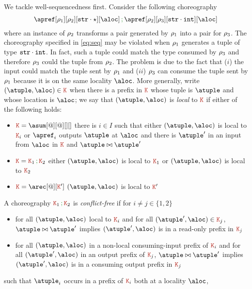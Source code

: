 We tackle well-sequencedness first.
%
Consider the following choreography
\begin{align}\label{eq:seq}
  \apref[\arole_1][\arole_2][{\asort[str] \cdot \wildcard}][\aloc] \seqop
  \apref[\arole_2][\arole_3][{\asort[str] \cdot \asort[int]}][\aloc]
\end{align}
%
where an instance of $\arole_2$ transforms a pair generated by
$\arole_1$ into a pair for $\arole_3$.
%
The choreography specified in \eqref{eq:seq} may be violated when
$\arole_1$ generates a tuple of type $\asort[str] \cdot \asort[int]$.
%
In fact, such a tuple could match the type consumed by $\arole_3$ and
therefore $\arole_3$ could  the tuple from $\arole_2$.
%
The problem is due to the fact that ($i$) the input could match the
tuple sent by $\arole_1$ and ($ii$) $\arole_3$ can consume the tuple
sent by $\arole_1$ because it is on the same locality $\aloc$.
%
More generally, write $(\atuple, \aloc) \in \aK$ when there is a
prefix in $\aK$ whose tuple is $\atuple$ and whose location is
$\aloc$; we say that $(\atuple, \aloc)$ is \emph{local} to $\aK$ if
either of the following holds:
\begin{itemize}
\item $\aK = \asum[@][@][][]$ there is $i \in I$ such that either
  $(\atuple, \aloc)$ is local to $\aK_i$ or $\apref_i$ outputs
  $\atuple$ at $\aloc$ and there is $\atuple'$ in an input from
  $\aloc$ in $\aK$ and $\atuple \matches \atuple'$
\item $\aK = \aK_1 \seqop \aK_2$ either $(\atuple, \aloc)$ is local to
  $\aK_1$ or   $(\atuple, \aloc)$ is local to $\aK_2$
\item $\aK = \arec[@][\aK']$ $(\atuple, \aloc)$ is local to $\aK'$
\end{itemize}
%
A choreography $\aK_1 \seqop \aK_2$ is \emph{conflict-free} if for
$i \neq j \in \{1,2\}$
%
\begin{itemize}
\item for all $(\atuple,\aloc)$ local to $\aK_i$ and for all
  $(\atuple', \aloc) \in \aK_j$, $\atuple \matches \atuple'$ implies
  $(\atuple', \aloc)$ is in a read-only prefix in $\aK_j$
\item for all $(\atuple,\aloc)$ in a non-local consuming-input prefix
  of $\aK_i$ and for all $(\atuple', \aloc)$ in an output prefix of
  $\aK_j$, $\atuple \matches \atuple'$ implies $(\atuple',\aloc)$ is
  in a consuming output prefix in $\aK_j$
  
\end{itemize}
such that $\atuple_i$ occurs in a prefix of
$\aK_i$ both at a locality $\aloc$,

